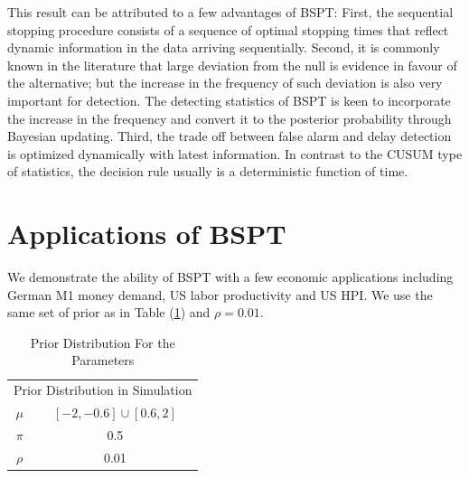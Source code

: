 \documentclass[preprint,authoryear,12pt,english]{elsarticle}
\theoremstyle{plain}
\begin{document}
This result can be attributed to a few advantages of BSPT: First, the sequential stopping procedure consists of a sequence of optimal stopping times that reflect dynamic information in the data arriving sequentially. Second, it is commonly known in the literature that large deviation from the null is evidence in favour of the alternative; but the increase in the frequency of such deviation is also very important for detection. The detecting statistics of BSPT is keen to incorporate the increase in the frequency and convert it to the posterior probability through Bayesian updating. Third, the trade off between false alarm and delay detection is optimized dynamically with latest information. In contrast to the CUSUM type of statistics, the decision rule usually is a deterministic function of time.

\section{Applications of BSPT}
We demonstrate the ability of BSPT with a few economic applications including German M1 money demand, US labor productivity and US HPI. We use the same set of prior as in Table (\ref{tbl:simulation prior}) and $\rho=0.01$.
\begin{table}[H]

    \footnotesize
    \centering
    \begin{minipage}{0.6\linewidth}
        \centering
        \begin{tabular}{c c}
            \hline
            \hline
            \multicolumn{2}{c}{Prior Distribution in Simulation} \\
            $\mu$  & $[-2,-0.6]\cup[0.6,2]$                      \\
            $\pi$  & 0.5                                         \\
            $\rho$ & 0.01                                        \\
            \hline
            \hline
        \end{tabular}
        \protect\caption{Prior Distribution For the Parameters}
        \label{tbl:simulation prior}
    \end{minipage}

\end{table}
\end{document}
